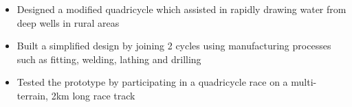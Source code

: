 \divider

\begin{itemize}
    \item Designed a modified quadricycle which assisted in rapidly drawing water from deep wells in rural areas
    \item Built a simplified design by joining 2 cycles using manufacturing processes such as fitting, welding, lathing and drilling
    \item Tested the prototype by participating in a quadricycle race on a multi-terrain, 2km long race track
\end{itemize}


